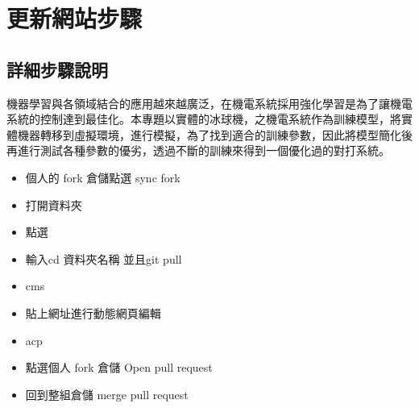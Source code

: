 \chapter{更新網站步驟}
\renewcommand{\baselinestretch}{10.0} %
\setcounter{page}{1}  %
\fontsize{14pt}{2.5pt}\sectionef
\section{詳細步驟說明}
機器學習與各領域結合的應用越來越廣泛，在機電系統採用強化學習是為了讓機電系統的控制達到最佳化。本專題以實體的冰球機，之機電系統作為訓練模型，將實體機器轉移到虛擬環境，進行模擬，為了找到適合的訓練參數，因此將模型簡化後再進行測試各種參數的優劣，透過不斷的訓練來得到一個優化過的對打系統。\\
\begin{itemize}
\item 個人的 fork 倉儲點選 sync fork 
\item 打開資料夾 
\item 點選 
\item 輸入cd 資料夾名稱 並且git pull 
\item cms 
\item 貼上網址進行動態網頁編輯 
\item acp 
\item 點選個人 fork 倉儲 Open pull request 
\item 回到整組倉儲 merge pull request
\end{itemize}
